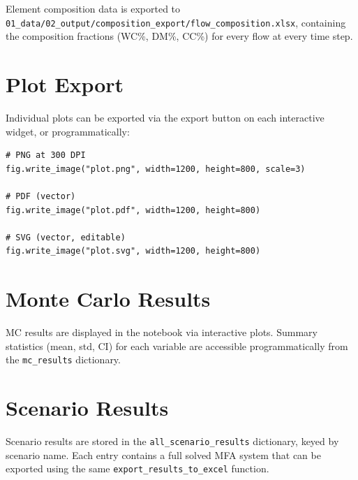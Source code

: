Element composition data is exported to \texttt{01\_data/02\_output/composition\_export/flow\_composition.xlsx}, containing the composition fractions (WC\%, DM\%, CC\%) for every flow at every time step.

\section{Plot Export}

Individual plots can be exported via the export button on each interactive widget, or programmatically:

\begin{lstlisting}[style=python]
# PNG at 300 DPI
fig.write_image("plot.png", width=1200, height=800, scale=3)

# PDF (vector)
fig.write_image("plot.pdf", width=1200, height=800)

# SVG (vector, editable)
fig.write_image("plot.svg", width=1200, height=800)
\end{lstlisting}

\section{Monte Carlo Results}

MC results are displayed in the notebook via interactive plots. Summary statistics (mean, std, CI) for each variable are accessible programmatically from the \texttt{mc\_results} dictionary.

\section{Scenario Results}

Scenario results are stored in the \texttt{all\_scenario\_results} dictionary, keyed by scenario name. Each entry contains a full solved MFA system that can be exported using the same \texttt{export\_results\_to\_excel} function.
